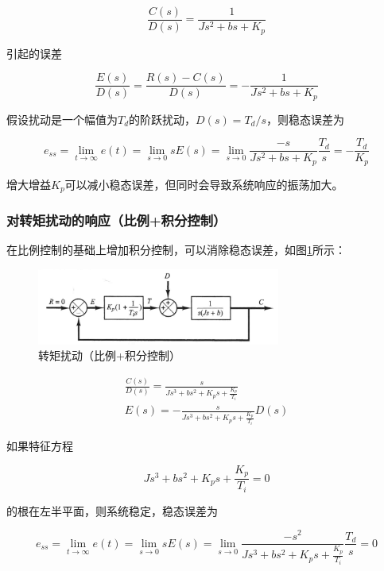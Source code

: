 \begin{equation*}
\frac{C(s)}{D(s)}=\frac{1}{Js^2+bs+K_p}
\end{equation*}

引起的误差

\begin{equation*}
\frac{E(s)}{D(s)}=\frac{R(s)-C(s)}{D(s)}=-\frac{1}{Js^2+bs+K_p}
\end{equation*}

假设扰动是一个幅值为$T_d$的阶跃扰动，$D(s)=T_d/s$，则稳态误差为

\begin{equation*}
e_{ss}=\lim_{t\to\infty}e(t)=\lim_{s\to0}sE(s)=\lim_{s\to0}\frac{-s}{Js^2+bs+K_p}\frac{T_d}{s}=-\frac{T_d}{K_p}
\end{equation*}

增大增益$K_p$可以减小稳态误差，但同时会导致系统响应的振荡加大。

\subsubsection{对转矩扰动的响应（比例+积分控制）}

在比例控制的基础上增加积分控制，可以消除稳态误差，如图\ref{16}所示：

\begin{figure}[!ht]
	\centering
	\includegraphics[width=8cm]{figures/16.png}
	\caption{转矩扰动（比例+积分控制）}
	\label{16}
\end{figure}

\begin{gather*}
\frac{C(s)}{D(s)}=\frac{s}{Js^3+bs^2+K_ps+\frac{K_p}{T_i}}\\
E(s)=-\frac{s}{Js^3+bs^2+K_ps+\frac{K_p}{T_i}}D(s)
\end{gather*}

如果特征方程

\begin{equation*}
Js^3+bs^2+K_ps+\frac{K_p}{T_i}=0
\end{equation*}

的根在左半平面，则系统稳定，稳态误差为

\begin{equation*}
e_{ss}=\lim_{t\to\infty}e(t)=\lim_{s\to0}sE(s)=\lim_{s\to0}\frac{-s^2}{Js^3+bs^2+K_ps+\frac{K_p}{T_i}}\frac{T_d}{s}=0
\end{equation*}

